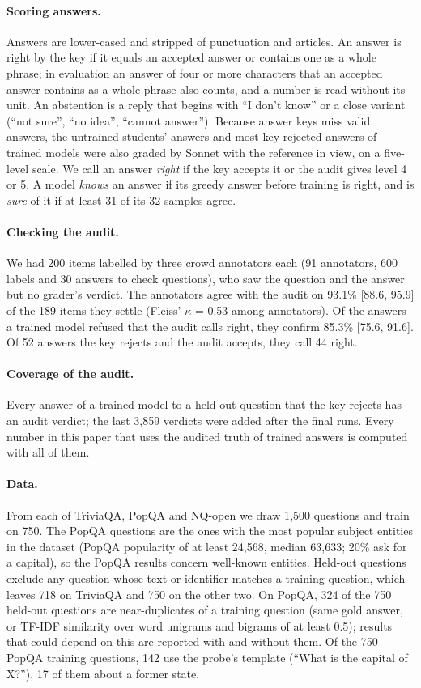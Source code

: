\paragraph{Scoring answers.} Answers are lower-cased and stripped of punctuation and articles. An answer is right by the key if it equals an accepted answer or contains one as a whole phrase; in evaluation an answer of four or more characters that an accepted answer contains as a whole phrase also counts, and a number is read without its unit. An abstention is a reply that begins with ``I don't know'' or a close variant (``not sure'', ``no idea'', ``cannot answer''). Because answer keys miss valid answers, the untrained students' answers and most key-rejected answers of trained models were also graded by Sonnet with the reference in view, on a five-level scale. We call an answer \emph{right} if the key accepts it or the audit gives level 4 or 5. A model \emph{knows} an answer if its greedy answer before training is right, and is \emph{sure} of it if at least 31 of its 32 samples agree.

\paragraph{Checking the audit.} We had 200 items labelled by three crowd annotators each (91 annotators, 600 labels and 30 answers to check questions), who saw the question and the answer but no grader's verdict. The annotators agree with the audit on 93.1\% [88.6, 95.9] of the 189 items they settle (Fleiss' $\kappa$ = 0.53 among annotators). Of the answers a trained model refused that the audit calls right, they confirm 85.3\% [75.6, 91.6]. Of 52 answers the key rejects and the audit accepts, they call 44 right.

\paragraph{Coverage of the audit.} Every answer of a trained model to a held-out question that the key rejects has an audit verdict; the last 3{,}859 verdicts were added after the final runs. Every number in this paper that uses the audited truth of trained answers is computed with all of them.

\paragraph{Data.} From each of TriviaQA, PopQA and NQ-open we draw 1{,}500 questions and train on 750. The PopQA questions are the ones with the most popular subject entities in the dataset (PopQA popularity of at least 24{,}568, median 63{,}633; 20\% ask for a capital), so the PopQA results concern well-known entities. Held-out questions exclude any question whose text or identifier matches a training question, which leaves 718 on TriviaQA and 750 on the other two. On PopQA, 324 of the 750 held-out questions are near-duplicates of a training question (same gold answer, or TF-IDF similarity over word unigrams and bigrams of at least 0.5); results that could depend on this are reported with and without them. Of the 750 PopQA training questions, 142 use the probe's template (``What is the capital of X?''), 17 of them about a former state.

